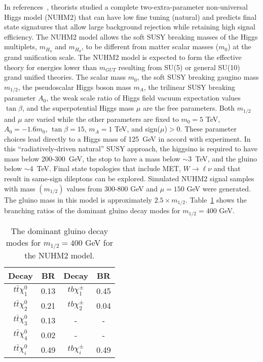 In references~\cite{Baer:2013xua,Baer:2013yha,Baer:2016usl}, 
theorists studied a complete two-extra-parameter non-universal Higgs model (NUHM2) 
that can have low fine tuning (natural) and
predicts final state signatures that allow large background rejection while retaining high 
signal efficiency. 
The NUHM2 model allows the soft SUSY breaking masses of the Higgs multiplets, $m_{H_{u}}$ and $m_{H_{d}}$, to be different from 
matter scalar masses ($m_{0}$) at the grand unification scale. The NUHM2 model is expected to form the effective theory for energies 
lower than $m_{GUT}$ resulting from SU(5) or general SU(10) grand unified theories.
The scalar mass $m_{0}$, the soft SUSY breaking gaugino mass $m_{1/2}$, the pseudoscalar Higgs boson mass $m_{A}$, the trilinear SUSY breaking parameter $A_{0}$, the weak scale ratio of Higgs field vacuum expectation values $\tan\beta$, and the superpotential Higgs mass $\mu$ are the free parameters.
Both $m_{1/2}$ and $\mu$ are varied while the other parameters are fixed to $m_{0} = 5$ TeV, $A_{0} = -1.6m_{0}$, $\tan\beta = 15$, $m_{A} = 1$ TeV, and sign($\mu$)$>$0. 
These parameter choices lead directly to a Higgs mass of 125~GeV in accord with experiment.  In this ``radiatively-driven natural'' SUSY approach, the higgsino is
required to have mass below 200-300~GeV, the stop to have a mass below
$\sim$3~TeV, and the gluino below $\sim$4~TeV.
Final state topologies that include MET, $W \to \ell\nu$ and 
that result in same-sign dileptons can be explored. 
Simulated NUHM2 signal samples with mass $(m_{1/2})$ values from 300-800 GeV and $\mu = 150$ GeV were generated.
The gluino mass in this model is approximately $2.5\times m_{1/2}$.
Table~\ref{tab:NUHM2} shows the branching ratios of the dominant gluino decay modes for $m_{1/2} = 400$ GeV.

\begin{table}[t!]
\begin{center}
\begin{tabular}{|c|c||c|c|}
\hline
\hline
Decay & BR & Decay & BR\\
\hline
$t\bar{t}\chi^{0}_{1}$ & 0.13 & $tb\chi^{\pm}_{1}$ & 0.45\\
$t\bar{t}\chi^{0}_{2}$ & 0.21 & $tb\chi^{\pm}_{2}$ & 0.04\\
$t\bar{t}\chi^{0}_{3}$ & 0.13 & - & - \\
$t\bar{t}\chi^{0}_{4}$ & 0.02 & - & - \\
\hline
$t\bar{t}\chi^{0}_{i}$ & 0.49 & $tb\chi^{\pm}_{i}$ & 0.49\\
\hline
\hline
\end{tabular}
\caption{The dominant gluino decay modes for $m_{1/2} = 400$ GeV for the NUHM2 model.}
\label{tab:NUHM2}
\end{center}
\end{table}

